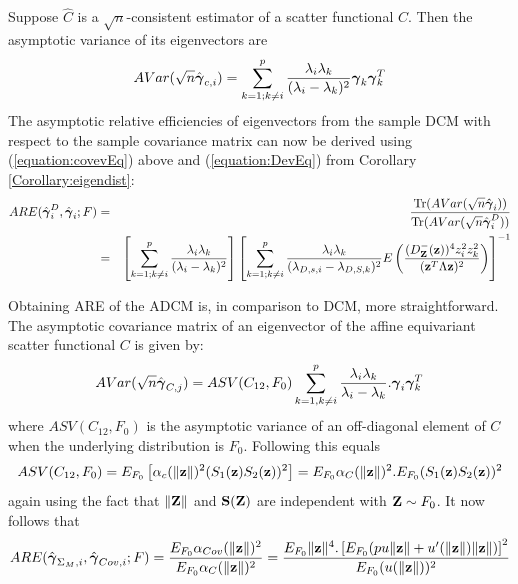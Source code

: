 Suppose $\hat C$ is a $\sqrt n$-consistent estimator of a scatter functional $C$. Then the asymptotic variance of its eigenvectors are \cite{anderson}
%
\begin{equation} \label{equation:covevEq}
AVar(\sqrt n\hat {{\boldsymbol{\gamma}}}_{c,i}) = \sum_{k=1; k \neq i}^p \frac{\lambda_i \lambda_k}{(\lambda_i - \lambda_k)^2} {\boldsymbol{\gamma}}_k {\boldsymbol{\gamma}}_k^T
\end{equation}
%
The asymptotic relative efficiencies of eigenvectors from the sample DCM with respect to the sample covariance matrix can now be derived using (\ref{equation:covevEq}) above and (\ref{equation:DevEq}) from Corollary \ref{Corollary:eigendist}:
%
\begin{eqnarray*}
ARE(\hat{{\boldsymbol{\gamma}}}^D_i, \hat{{\boldsymbol{\gamma}}}_i; F) &=& \frac{\operatorname*{Tr}( AVar(\sqrt n\hat {{\boldsymbol{\gamma}}}_i))}{\operatorname*{Tr}( AVar(\sqrt n\hat {{\boldsymbol{\gamma}}}^D_i))}\\
&=& \left[\sum_{k=1; k \neq i}^p \frac{\lambda_i \lambda_k}{(\lambda_i - \lambda_k)^2} \right] \left[ \sum_{k=1; k \neq i}^p \frac{\lambda_i \lambda_k }{(\lambda_{D,s,i} - \lambda_{D,S,k})^2} E \left( \frac{(D^-_{\mathbf{Z}} ({\bf{z}}))^4 z_i^2 z_k^2}{({\bf{z}}^T \Lambda {\bf{z}})^2} \right) \right]^{-1}
\end{eqnarray*}

Obtaining ARE of the ADCM is, in comparison to DCM, more straightforward. The asymptotic covariance matrix of an eigenvector of the affine equivariant scatter functional $C$ is given by:
%
$$
AVar (\sqrt n  \hat{{\boldsymbol{\gamma}}}_{C,j}) = ASV (C_{12}, F_0) \sum_{k=1, k \neq i}^p \frac{\lambda_i \lambda_k}{\lambda_i - \lambda_k}. {\boldsymbol{\gamma}}_i {\boldsymbol{\gamma}}_k^T
$$
%
where $ASV (C_{12}, F_0)$ is the asymptotic variance of an off-diagonal element of $C$ when the underlying distribution is $F_0$. Following \cite{croux00} this equals
%
$$
ASV (C_{12}, F_0) = E_{F_0} \left[ \alpha_c (\| {\bf{z}} \|)^2 (S_1({\bf{z}})S_2 ({\bf{z}}))^2 \right] = E_{F_0} \alpha_C (\| {\bf{z}} \|)^2 . E_{F_0} (S_1({\bf{z}})S_2 ({\bf{z}}))^2 
$$
% 
again using the fact that $\|{\mathbf{Z}}\|$ and ${\mathbf{S}}({\mathbf{Z}})$ are independent with ${\mathbf{Z}} \sim F_0$. It now follows that
%
\begin{equation}
ARE (\hat{{\boldsymbol{\gamma}}}_{\Sigma_M,i}, \hat{{\boldsymbol{\gamma}}}_{Cov,i}; F) = \frac{E_{F_0} \alpha_{Cov} (\| {\bf{z}} \|)^2}{E_{F_0} \alpha_C (\| {\bf{z}} \|)^2} = \frac{E_{F_0} \| {\bf{z}} \|^4. \left[ E_{F_0} ( p u \| {\bf{z}}\| + u'( \| {\bf{z}} \|) \| {\bf{z}} \| ) \right]^2}{E_{F_0} (u(\| {\bf{z}} \|))^2}
\end{equation}
%

